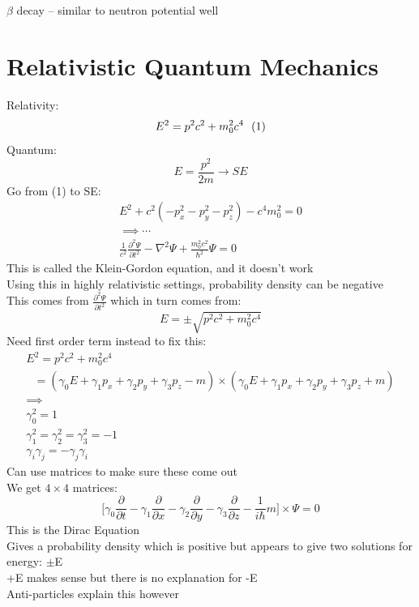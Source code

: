\documentclass[a4paper, 11pt, fleqn, normalem]{report}
\begin{document}
$\beta$ decay -- similar to neutron potential well

\section{Relativistic Quantum Mechanics}
Relativity:
\begin{equation*}
    E^{2} = p^{2}c^{2} + m_{0}^{2}c^{4} ~~ (1) \\
\end{equation*}
Quantum:
\begin{equation*}
    E = \frac{p^{2}}{2m} \rightarrow SE
\end{equation*}
Go from (1) to SE:
\begin{gather*}
    E^{2} + c^{2}(-p_{x}^{2} - p_{y}^{2} - p_{z}^{2}) - c^{4}m_{0}^{2} = 0 \\
    \implies \cdots \\
    \frac{1}{c^{2}}\frac{\partial^{2}\Psi}{\partial t^{2}} - \nabla^{2}\Psi + \frac{m_{0}^{2}c^{2}}{\hbar^{2}}\Psi = 0
\end{gather*}
This is called the Klein-Gordon equation, and it doesn't work \\
Using this in highly relativistic settings, probability density can be negative \\
This comes from $\frac{\partial^{2}\Psi}{\partial t^{2}}$ which in turn comes from:
\begin{equation*}
    E = \pm\sqrt{p^{2}c^{2} + m_{0}^{2}c^{4}}
\end{equation*}
Need first order term instead to fix this:
\begin{gather*}
    E^{2} = p^{2}c^{2} + m_{0}^{2}c^{4} \\
    ~~~ = (\gamma_{0}E + \gamma_{1}p_{x} + \gamma_{2}p_{y} + \gamma_{3}p_{z} - m) \times (\gamma_{0}E + \gamma_{1}p_{x} + \gamma_{2}p_{y} + \gamma_{3}p_{z} + m) \\
    \implies \\
    \gamma_{0}^{2} = 1 \\
    \gamma_{1}^{2} = \gamma_{2}^{2} = \gamma_{3}^{2} = -1 \\
    \gamma_{i}\gamma_{j} = -\gamma_{j}\gamma_{i}
\end{gather*}
Can use matrices to make sure these come out \\
We get $4 \times 4$ matrices:
\begin{equation*}
    \Bigg[\gamma_{0}\frac{\partial}{\partial t} - \gamma_{1}\frac{\partial}{\partial x} - \gamma_{2}\frac{\partial}{\partial y} - \gamma_{3}\frac{\partial}{\partial z} - \frac{1}{i\hbar}m\Bigg]\times\Psi = 0
\end{equation*}
This is the Dirac Equation \\
Gives a probability density which is positive but appears to give two solutions for energy: $\pm$E \\
+E makes sense but there is no explanation for -E \\
Anti-particles explain this however
\end{document}
